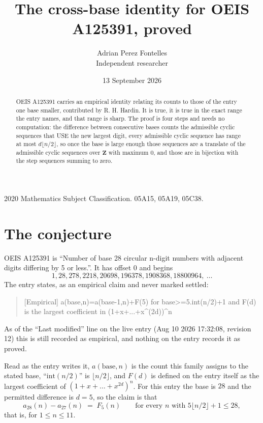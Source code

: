 \documentclass[11pt,a4paper]{article}
\title{The cross-base identity for OEIS A125391, proved}
\author{Adrian Perez Fontelles\\ \small Independent researcher}
\date{13 September 2026}
\theoremstyle{plain}
\theoremstyle{definition}
\begin{document}
\maketitle

\begin{abstract}
OEIS A125391 carries an empirical identity relating its counts to those of the entry one base
smaller, contributed by R. H. Hardin. It is true, it is true in the exact range the entry
names, and that range is sharp. The proof is four steps and needs no computation: the
difference between consecutive bases counts the admissible cyclic sequences that USE the new
largest digit, every admissible cyclic sequence has range at most $d\lfloor n/2\rfloor$, so
once the base is large enough those sequences are a translate of the admissible cyclic
sequences over $\mathbf{Z}$ with maximum $0$, and those are in bijection with the step
sequences summing to zero.
\end{abstract}

\noindent\small 2020 Mathematics Subject Classification. 05A15, 05A19, 05C38.\normalsize

\section{The conjecture}

OEIS A125391 is ``Number of base 28 circular n-digit numbers with adjacent digits differing by 5 or less.''. It has offset $0$ and begins
\[
1, 28, 278, 2218, 20698, 196378, 1908368, 18800964,\ \dots
\]
The entry states, as an empirical claim and never marked settled:
\begin{quote}
[Empirical] a(base,n)=a(base-1,n)+F(5) for base>=5.int(n/2)+1 and F(d) is the largest coefficient in (1+x+...+x\textasciicircum{}(2d))\textasciicircum{}n
\end{quote}
As of the ``Last modified'' line on the live entry (Aug 10 2026 17:32:08, revision 12)
this is still recorded as empirical, and nothing on the entry records it as proved.

Read as the entry writes it, $a(\mathrm{base},n)$ is the count this family assigns to the
stated base, ``$\mathrm{int}(n/2)$'' is $\lfloor n/2\rfloor$, and $F(d)$ is defined on the
entry itself as the largest coefficient of $(1+x+\dots+x^{2d})^{n}$. For this entry
the base is $28$ and the permitted difference is $d=5$, so the claim is that
\[
a_{28}(n)-a_{27}(n)\;=\;F_{5}(n)
\qquad\text{for every } n \text{ with } 5\lfloor n/2\rfloor+1\le28,
\]
that is, for $1\le n\le11$.
\end{document}
